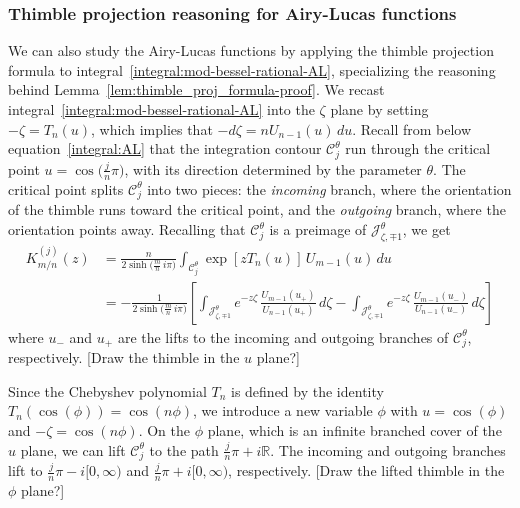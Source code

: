 \documentclass{article}
\newcommand{\R}{\mathbb{R}}
\theoremstyle{definition}
\theoremstyle{plain}
\newenvironment{todo}{\color{Coral}}{\color{black}}
\begin{document}
\subsubsection{Thimble projection reasoning for Airy-Lucas functions}\label{contour-argument-AL}
We can also study the Airy-Lucas functions by applying the thimble projection formula to integral~\eqref{integral:mod-bessel-rational-AL}, specializing the reasoning behind Lemma~\ref{lem:thimble_proj_formula-proof}. We recast integral~\eqref{integral:mod-bessel-rational-AL} into the $\zeta$ plane by setting $-\zeta = T_n(u)$, which implies that $-d\zeta = n U_{n-1}(u)\,du$. Recall from below equation~\eqref{integral:AL} that the integration contour $\mathcal{C}^\theta_j$ run through the critical point $u = \cos\big(\tfrac{j}{n}\pi\big)$, with its direction determined by the parameter $\theta$. The critical point splits $\mathcal{C}^\theta_j$ into two pieces: the {\em incoming} branch, where the orientation of the thimble runs toward the critical point, and the {\em outgoing} branch, where the orientation points away. Recalling that $\mathcal{C}^\theta_j$ is a preimage of $\mathcal{J}^\theta_{\zeta, \mp 1}$, we get
\begin{align*}%
K^{(j)}_{m/n}(z) & = \frac{n}{2 \sinh\big(\tfrac{m}{n}\,i\pi\big)} \int_{\mathcal{C}^\theta_j} \exp\left[z T_n(u)\right]\,U_{m-1}(u)\,du \\
& = -\frac{1}{2\sinh\big(\tfrac{m}{n}\,i\pi\big)} \left[ \int_{\mathcal{J}^\theta_{\zeta, \mp 1}} e^{-z\zeta}\,\frac{U_{m-1}(u_+)}{U_{n-1}(u_+)}\,d\zeta - \int_{\mathcal{J}^\theta_{\zeta, \mp 1}} e^{-z\zeta}\,\frac{U_{m-1}(u_-)}{U_{n-1}(u_-)}\,d\zeta \right]
\end{align*}
where $u_-$ and $u_+$ are the lifts to the incoming and outgoing branches of $\mathcal{C}^\theta_j$, respectively. \begin{todo}[Draw the thimble in the $u$ plane?]\end{todo}

Since the Chebyshev polynomial $T_n$ is defined by the identity $T_n(\cos(\phi)) = \cos(n\phi)$, we introduce a new variable $\phi$ with $u = \cos(\phi)$ and $-\zeta = \cos(n\phi)$. On the $\phi$ plane, which is an infinite branched cover of the $u$ plane, we can lift $\mathcal{C}^\theta_j$ to the path $\tfrac{j}{n}\pi + i\R$. The incoming and outgoing branches lift to $\tfrac{j}{n}\pi - i[0, \infty)$ and $\tfrac{j}{n}\pi + i[0, \infty)$, respectively. \begin{todo}[Draw the lifted thimble in the $\phi$ plane?]\end{todo}
\end{document}
